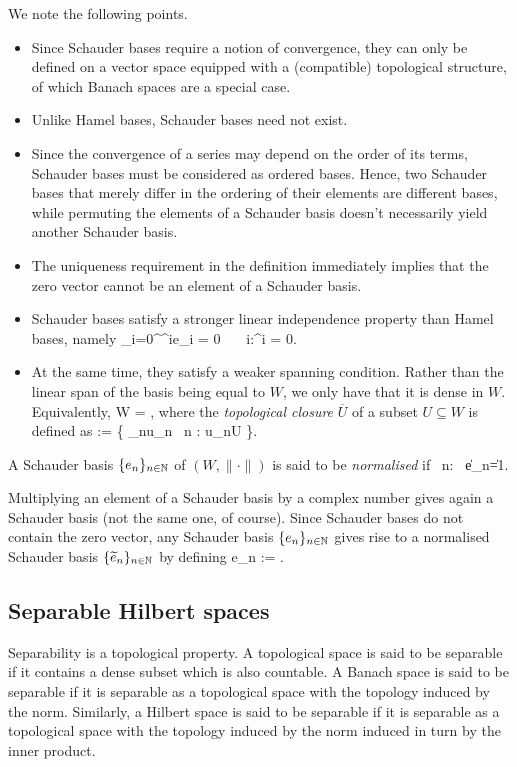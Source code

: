 \noindent We note the following points.
\begin{itemize}
\item Since Schauder bases require a notion of convergence, they can only be defined on a vector space equipped with a (compatible) topological structure, of which Banach spaces are a special case.
\item Unlike Hamel bases, Schauder bases need not exist.
\item Since the convergence of a series may depend on the order of its terms, Schauder bases must be considered as ordered bases. Hence, two Schauder bases that merely differ in the ordering of their elements are different bases, while permuting the elements of a Schauder basis doesn't necessarily  yield another Schauder basis.
\item The uniqueness requirement in the definition immediately implies that the zero vector cannot be an element of a Schauder basis. 
\item Schauder bases satisfy a stronger linear independence property than Hamel bases, namely
\bse
\sum_{i=0}^{\infty}\lambda^ie_i = 0 \ \Rightarrow \ \forall \, i\in \N:\lambda^i = 0.
\ese
\item At the same time, they satisfy a weaker spanning condition. Rather than the linear span of the basis being equal to $W$, we only have that it is dense in $W$. Equivalently,
\bse
W =  ,
\ese
where the \emph{topological closure} $\overline{U}$ of a subset $U\subseteq W$ is defined as
\bse
{} := \bigl\{ \lim_{n\to\infty}u_n \mid \forall \, n \in \N : u_n\in U \bigr\}.
\ese
\end{itemize}

\bd
A Schauder basis $\{e_n\}_{n\in \mathbb{N}}$ of $(W,\|\cdot\|)$ is said to be \emph{normalised} if
\bse
\forall \, n\in \N : \ \|e_n\|=1.
\ese
\ed

Multiplying an element of a Schauder basis by a complex number gives again a Schauder basis (not the same one, of course). Since Schauder bases do not contain the zero vector, any Schauder basis $\{e_n\}_{n\in \mathbb{N}}$ gives rise to a normalised Schauder basis $\{\widetilde e_n\}_{n\in \mathbb{N}}$ by defining
\bse
\widetilde e_n := .
\ese

\subsection{Separable Hilbert spaces}

Separability is a topological property. A topological space is said to be separable if it contains a dense subset which is also countable. A Banach space is said to be separable if it is separable as a topological space with the topology induced by the norm. Similarly, a Hilbert space is said to be separable if it is separable as a topological space with the topology induced by the norm induced in turn by the inner product.

